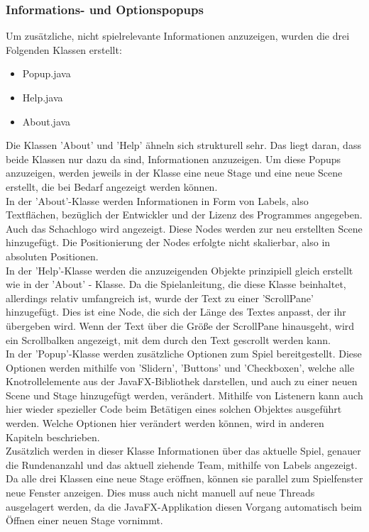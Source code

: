 \documentclass[12pt,a4paper]{article}
\begin{document}
\subsubsection{Informations- und Optionspopups}
\label{SUBSUBSEC:OPTIONS}
Um zusätzliche, nicht spielrelevante Informationen anzuzeigen, wurden die drei Folgenden Klassen erstellt: 
\begin{itemize}
\item{Popup.java}
\item{Help.java}
\item{About.java}
\end{itemize}
Die Klassen 'About' und 'Help' ähneln sich strukturell sehr. Das liegt daran, dass beide Klassen nur dazu da sind, Informationen anzuzeigen. Um diese Popups anzuzeigen, werden jeweils in der Klasse eine neue Stage und eine neue Scene erstellt, die bei Bedarf angezeigt werden können. \\
In der 'About'-Klasse werden Informationen in Form von Labels, also Textflächen, bezüglich der Entwickler und der Lizenz des Programmes angegeben. Auch das Schachlogo wird angezeigt. Diese Nodes werden zur neu erstellten Scene hinzugefügt. Die Positionierung der Nodes erfolgte nicht skalierbar, also in absoluten Positionen.\\
In der 'Help'-Klasse werden die anzuzeigenden Objekte prinzipiell gleich erstellt wie in der 'About' - Klasse. Da die Spielanleitung, die diese Klasse beinhaltet, allerdings relativ umfangreich ist, wurde der Text zu einer 'ScrollPane' hinzugefügt. Dies ist eine Node, die sich der Länge des Textes anpasst, der ihr übergeben wird. Wenn der Text über die Größe der ScrollPane hinausgeht, wird ein Scrollbalken angezeigt, mit dem durch den Text gescrollt werden kann. \\
In der 'Popup'-Klasse werden zusätzliche Optionen zum Spiel bereitgestellt. Diese Optionen werden mithilfe von 'Slidern', 'Buttons' und 'Checkboxen', welche alle Knotrollelemente aus der JavaFX-Bibliothek darstellen, und auch zu einer neuen Scene und Stage hinzugefügt werden, verändert. 
Mithilfe von Listenern kann auch hier wieder spezieller Code beim Betätigen eines solchen Objektes ausgeführt werden. Welche Optionen hier verändert werden können, wird in anderen Kapiteln beschrieben.\\
Zusätzlich werden in dieser Klasse Informationen über das aktuelle Spiel, genauer die Rundenanzahl und das aktuell ziehende Team, mithilfe von Labels angezeigt. \\
Da alle drei Klassen eine neue Stage eröffnen, können sie parallel zum Spielfenster neue Fenster anzeigen. Dies muss auch nicht manuell auf neue Threads ausgelagert werden, da die JavaFX-Applikation diesen Vorgang automatisch beim Öffnen einer neuen Stage vornimmt. 
\end{document}
